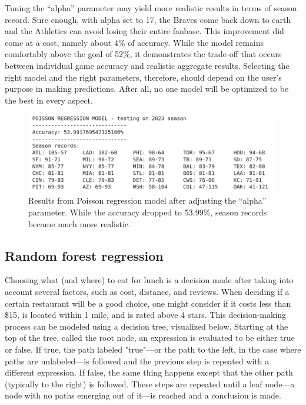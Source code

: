 \documentclass{paper}
\begin{document}
Tuning the ``alpha'' parameter may yield more realistic results in terms of season record. Sure enough, with alpha set to 17, the Braves come back down to earth and the Athletics can avoid losing their entire fanbase. This improvement did come at a cost, namely about 4\% of accuracy. While the model remains comfortably above the goal of 52\%, it demonstrates the trade-off that occurs between individual game accuracy and realistic aggregate results. Selecting the right model and the right parameters, therefore, should depend on the user's purpose in making predictions. After all, no one model will be optimized to be the best in every aspect.

\begin{figure}[H]
  \centering
  \includegraphics[width=13cm]{fig6}
  \caption{Results from Poisson regression model after adjusting the ``alpha'' parameter. While the accuracy dropped to 53.99\%, season records became much more realistic.}
\end{figure}

\subsection{Random forest regression}
Choosing what (and where) to eat for lunch is a decision made after taking into account several factors, such as cost, distance, and reviews. When deciding if a certain restaurant will be a good choice, one might consider if it costs less than \$15, is located within 1 mile, and is rated above 4 stars. This decision-making process can be modeled using a decision tree, visualized below. Starting at the top of the tree, called the root node, an expression is evaluated to be either true or false. If true, the path labeled "true"---or the path to the left, in the case where paths are unlabeled---is followed and the previous step is repeated with a different expression. If false, the same thing happens except that the other path (typically to the right) is followed. These steps are repeated until a leaf node---a node with no paths emerging out of it---is reached and a conclusion is made.
\end{document}

